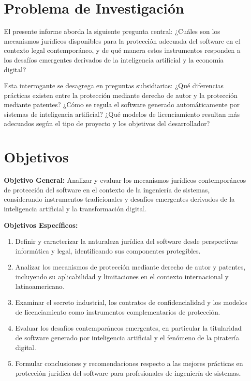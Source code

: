 \documentclass[11pt,a4paper]{report}
\begin{document}
\section*{Problema de Investigación}

El presente informe aborda la siguiente pregunta central: ¿Cuáles son los mecanismos jurídicos disponibles para la protección adecuada del software en el contexto legal contemporáneo, y de qué manera estos instrumentos responden a los desafíos emergentes derivados de la inteligencia artificial y la economía digital?

Esta interrogante se desagrega en preguntas subsidiarias: ¿Qué diferencias prácticas existen entre la protección mediante derecho de autor y la protección mediante patentes? ¿Cómo se regula el software generado automáticamente por sistemas de inteligencia artificial? ¿Qué modelos de licenciamiento resultan más adecuados según el tipo de proyecto y los objetivos del desarrollador?

\section*{Objetivos}

\textbf{Objetivo General:} Analizar y evaluar los mecanismos jurídicos contemporáneos de protección del software en el contexto de la ingeniería de sistemas, considerando instrumentos tradicionales y desafíos emergentes derivados de la inteligencia artificial y la transformación digital.

\textbf{Objetivos Específicos:}
\begin{enumerate}[label=\arabic*.]
    \item Definir y caracterizar la naturaleza jurídica del software desde perspectivas informática y legal, identificando sus componentes protegibles.
    \item Analizar los mecanismos de protección mediante derecho de autor y patentes, incluyendo su aplicabilidad y limitaciones en el contexto internacional y latinoamericano.
    \item Examinar el secreto industrial, los contratos de confidencialidad y los modelos de licenciamiento como instrumentos complementarios de protección.
    \item Evaluar los desafíos contemporáneos emergentes, en particular la titularidad de software generado por inteligencia artificial y el fenómeno de la piratería digital.
    \item Formular conclusiones y recomendaciones respecto a las mejores prácticas en protección jurídica del software para profesionales de ingeniería de sistemas.
\end{enumerate}
\end{document}
